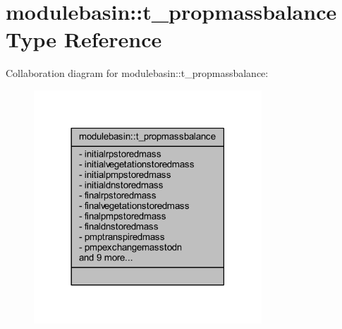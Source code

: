 \hypertarget{structmodulebasin_1_1t__propmassbalance}{}\section{modulebasin\+:\+:t\+\_\+propmassbalance Type Reference}
\label{structmodulebasin_1_1t__propmassbalance}


Collaboration diagram for modulebasin\+:\+:t\+\_\+propmassbalance\+:\nopagebreak
\begin{figure}[H]
\begin{center}
\leavevmode
\includegraphics[width=242pt]{structmodulebasin_1_1t__propmassbalance__coll__graph}
\end{center}
\end{figure}
